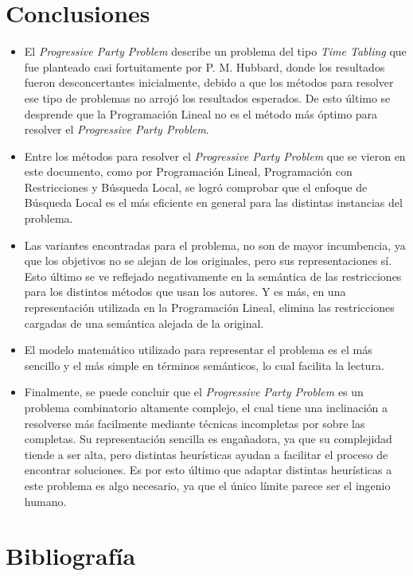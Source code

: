 \documentclass[letter, 10pt]{article}
\begin{document}
\section{Conclusiones}
\begin{itemize}
\item El \textit{Progressive Party Problem} describe un problema del tipo \textit{Time Tabling} que fue planteado casi fortuitamente por P. M. Hubbard, donde los resultados fueron desconcertantes inicialmente, debido a que los métodos para resolver ese tipo de problemas no arrojó los resultados esperados. De esto último se desprende que la Programación Lineal no es el método más óptimo para resolver el \textit{Progressive Party Problem}.

\item Entre los métodos para resolver el \textit{Progressive Party Problem} que se vieron en este documento, como por Programación Lineal, Programación con Restricciones y Búsqueda Local, se logró comprobar que el enfoque de Búsqueda Local es el más eficiente en general para las distintas instancias del problema.

\item Las variantes encontradas para el problema, no son de mayor incumbencia, ya que los objetivos no se alejan de los originales, pero sus representaciones sí. Esto último se ve reflejado negativamente en la semántica de las restricciones para los distintos métodos que usan los autores. Y es más, en una representación utilizada en la Programación Lineal, elimina las restricciones cargadas de una semántica alejada de la original.

\item El modelo matemático utilizado para representar el problema es el más sencillo y el más simple en términos semánticos, lo cual facilita la lectura.

\item Finalmente, se puede concluir que el \textit{Progressive Party Problem} es un problema combinatorio altamente complejo, el cual tiene una inclinación a resolverse más facilmente mediante técnicas incompletas por sobre las completas. Su representación sencilla es engañadora, ya que su complejidad tiende a ser alta, pero distintas heurísticas ayudan a facilitar el proceso de encontrar soluciones. Es por esto último que adaptar distintas heurísticas a este problema es algo necesario, ya que el único límite parece ser el ingenio humano.
\end{itemize}

\section{Bibliografía}


\end{document}
